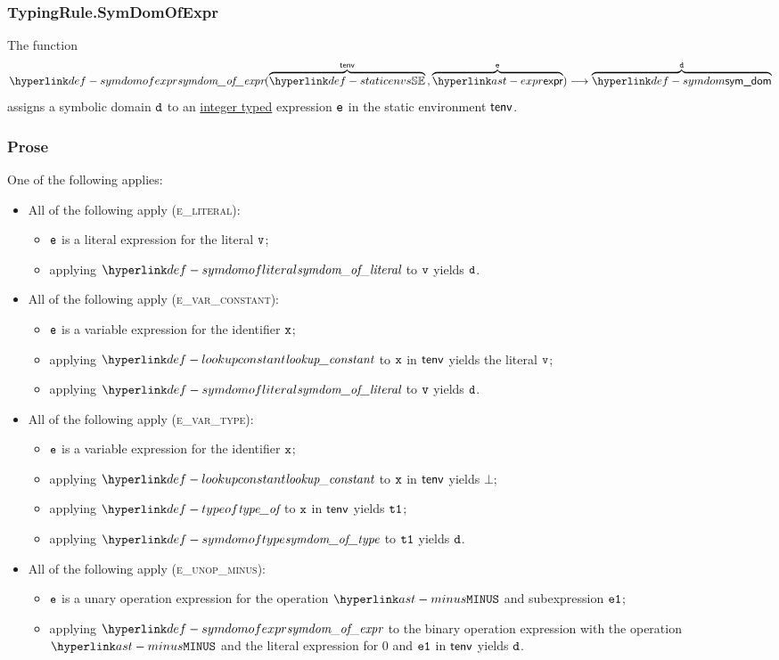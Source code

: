 \subsubsection{TypingRule.SymDomOfExpr \label{sec:TypingRule.SymDomOfExpr}}
\hypertarget{def-symdomofexpr}{}
The function
\[
\symdomofexpr(
  \overname{\staticenvs}{\tenv} \aslsep
  \overname{\expr}{\ve}
) \aslto
\overname{\symdom}{\vd}
\]
assigns a symbolic domain $\texttt{d}$ to an \underline{integer typed} expression $\texttt{e}$ in the static environment $\textsf{tenv}$.

\subsubsection{Prose}
One of the following applies:
\begin{itemize}
  \item All of the following apply (\textsc{e\_literal}):
  \begin{itemize}
    \item $\texttt{e}$ is a literal expression for the literal $\texttt{v}$;
    \item applying $\symdomofliteral$ to $\texttt{v}$ yields $\texttt{d}$.
  \end{itemize}

  \item All of the following apply (\textsc{e\_var\_constant}):
  \begin{itemize}
    \item $\texttt{e}$ is a variable expression for the identifier $\texttt{x}$;
    \item applying $\lookupconstant$ to $\texttt{x}$ in $\textsf{tenv}$ yields the literal $\texttt{v}$;
    \item applying $\symdomofliteral$ to $\texttt{v}$ yields $\texttt{d}$.
  \end{itemize}

  \item All of the following apply (\textsc{e\_var\_type}):
  \begin{itemize}
    \item $\texttt{e}$ is a variable expression for the identifier $\texttt{x}$;
    \item applying $\lookupconstant$ to $\texttt{x}$ in $\textsf{tenv}$ yields $\bot$;
    \item applying $\typeof$ to $\texttt{x}$ in $\textsf{tenv}$ yields $\texttt{t1}$;
    \item applying $\symdomoftype$ to $\texttt{t1}$ yields $\texttt{d}$.
  \end{itemize}

  \item All of the following apply (\textsc{e\_unop\_minus}):
  \begin{itemize}
    \item $\texttt{e}$ is a unary operation expression for the operation $\MINUS$ and subexpression $\texttt{e1}$;
    \item applying $\symdomofexpr$ to the binary operation expression with the operation $\MINUS$
          and the literal expression for $0$ and $\texttt{e1}$ in $\textsf{tenv}$ yields $\texttt{d}$.
  \end{itemize}


\end{itemize}
